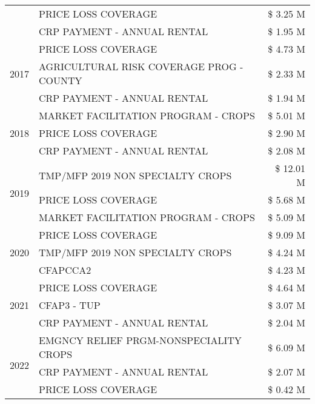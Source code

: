 \begin{tabular}{llr}
 & PRICE LOSS COVERAGE & \$ 3.25 M \\
 & CRP PAYMENT - ANNUAL RENTAL & \$ 1.95 M \\
\cline{1-3}
\multirow[t]{3}{*}{2017} & PRICE LOSS COVERAGE & \$ 4.73 M \\
 & AGRICULTURAL RISK COVERAGE PROG - COUNTY & \$ 2.33 M \\
 & CRP PAYMENT - ANNUAL RENTAL & \$ 1.94 M \\
\cline{1-3}
\multirow[t]{3}{*}{2018} & MARKET FACILITATION PROGRAM - CROPS & \$ 5.01 M \\
 & PRICE LOSS COVERAGE & \$ 2.90 M \\
 & CRP PAYMENT - ANNUAL RENTAL & \$ 2.08 M \\
\cline{1-3}
\multirow[t]{3}{*}{2019} & TMP/MFP 2019 NON SPECIALTY CROPS & \$ 12.01 M \\
 & PRICE LOSS COVERAGE & \$ 5.68 M \\
 & MARKET FACILITATION PROGRAM - CROPS & \$ 5.09 M \\
\cline{1-3}
\multirow[t]{3}{*}{2020} & PRICE LOSS COVERAGE & \$ 9.09 M \\
 & TMP/MFP 2019 NON SPECIALTY CROPS & \$ 4.24 M \\
 & CFAPCCA2 & \$ 4.23 M \\
\cline{1-3}
\multirow[t]{3}{*}{2021} & PRICE LOSS COVERAGE & \$ 4.64 M \\
 & CFAP3 - TUP & \$ 3.07 M \\
 & CRP PAYMENT - ANNUAL RENTAL & \$ 2.04 M \\
\cline{1-3}
\multirow[t]{3}{*}{2022} & EMGNCY RELIEF PRGM-NONSPECIALITY CROPS & \$ 6.09 M \\
 & CRP PAYMENT - ANNUAL RENTAL & \$ 2.07 M \\
 & PRICE LOSS COVERAGE & \$ 0.42 M \\
\cline{1-3}
\bottomrule
\end{tabular}
